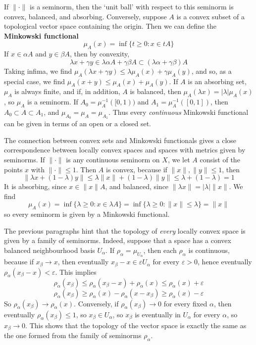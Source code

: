 If $\| \cdot \|$ is a seminorm, then the `unit ball' with respect to this seminorm is convex, balanced, and absorbing. Conversely, suppose $A$ is a convex subset of a topological vector space containing the origin. Then we can define the {\bf Minkowski functional}
%   
\[ \mu_A(x) = \inf \{ t \geq 0: x \in tA \} \]
%
If $x \in \alpha A$ and $y \in \beta A$, then by convexity,
%
\[ \lambda x + \gamma y \in \lambda \alpha A + \gamma \beta A \subset (\lambda \alpha + \gamma \beta) A \]
%
Taking infima, we find $\mu_A(\lambda x + \gamma y) \leq \lambda \mu_A(x) + \gamma \mu_A(y)$, and so, as a special case, we find $\mu_A(x + y) \leq \mu_A(x) + \mu_A(y)$. If $A$ is an absorbing set, $\mu_A$ is always finite, and if, in addition, $A$ is balanced, then $\mu_A(\lambda x) = |\lambda| \mu_A(x)$, so $\mu_A$ is a seminorm. If $A_0 = \mu_A^{-1}([0,1))$ and $A_1 = \mu_A^{-1}([0,1])$, then $A_0 \subset A \subset A_1$, and $\mu_{A_0} = \mu_A = \mu_{A_1}$. Thus every {\it continuous} Minkowski functional can be given in terms of an open or a closed set.

The connection between convex sets and Minkowski functionals gives a close correspondence between locally convex spaces and spaces with metrics given by seminorms. If $\| \cdot \|$ is any continuous seminorm on $X$, we let $A$ consist of the points $x$ with $\| \cdot \| \leq 1$. Then $A$ is convex, because if $\| x \|, \| y \| \leq 1$, then
%
\[ \| \lambda x + (1 - \lambda) y \| \leq \lambda \| x \| + (1 - \lambda) \| y \| \leq \lambda + (1 - \lambda) = 1 \]
%
It is absorbing, since $x \in \| x \| A$, and balanced, since $\| \lambda x \| = |\lambda| \| x \|$. We find
%
\[ \mu_A(x) = \inf \{ \lambda \geq 0: x \in \lambda A \} = \inf \{ \lambda \geq 0: \| x \| \leq \lambda \} = \| x \| \]
%
so every seminorm is given by a Minkowski functional.

The previous paragraphs hint that the topology of {\it every} locally convex space is given by a family of seminorms. Indeed, suppose that a space has a convex balanced neighbourhood basis $U_\alpha$. If $\rho_\alpha = \mu_{U_\alpha}$, then each $\rho_\alpha$ is continuous, because if $x_\beta \to x$, then eventually $x_\beta - x \in \varepsilon U_\alpha$ for every $\varepsilon > 0$, hence eventually $\rho_\alpha(x_\beta - x) < \varepsilon$. This implies
%
\[ \rho_\alpha(x_\beta) \leq \rho_\alpha(x_\beta - x) + \rho_\alpha(x) \leq \rho_\alpha(x) + \varepsilon \]
\[ \rho_\alpha(x_\beta) \geq \rho_\alpha(x) - \rho_\alpha(x - x_\beta) \geq \rho_\alpha(x) - \varepsilon \]
%
So $\rho_\alpha(x_\beta) \to \rho_\alpha(x)$. Conversely, if $\rho_\alpha(x_\beta) \to 0$ for every fixed $\alpha$, then eventually $\rho_\alpha(x_\beta) \leq 1$, so $x_\beta \in U_\alpha$, so $x_\beta$ is eventually in $U_\alpha$ for every $\alpha$, so $x_\beta \to 0$. This shows that the topology of the vector space is exactly the same as the one formed from the family of seminorms $\rho_\alpha$.


